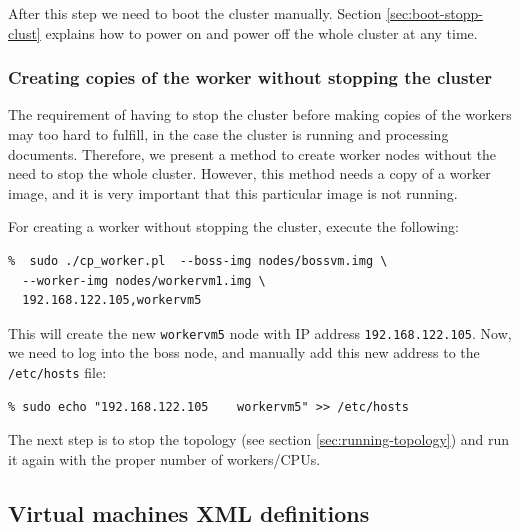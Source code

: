 \documentclass[a4]{article}
\begin{document}
After this step we need to boot the cluster manually. Section
\ref{sec:boot-stopp-clust} explains how to power on and power off the whole
cluster at any time.

\subsubsection*{Creating copies of the worker without stopping the cluster}
\label{sec:creat-copi-work}

The requirement of having to stop the cluster before making copies of the
workers may too hard to fulfill, in the case the cluster is running and
processing documents. Therefore, we present a method to create worker
nodes without the need to stop the whole cluster. However, this method needs
a copy of a worker image, and it is very important that this particular
image is not running.

For creating a worker without stopping the cluster, execute the following:

\begin{verbatim}
%  sudo ./cp_worker.pl  --boss-img nodes/bossvm.img \
  --worker-img nodes/workervm1.img \
  192.168.122.105,workervm5
\end{verbatim}

This will create the new \texttt{workervm5} node with IP address
\texttt{192.168.122.105}. Now, we need to log into the boss node, and
manually add this new address to the \texttt{/etc/hosts} file:

\begin{verbatim}
% sudo echo "192.168.122.105	workervm5" >> /etc/hosts
\end{verbatim}

The next step is to stop the topology (see section
\ref{sec:running-topology}) and run it again with the proper number of
workers/CPUs.

\subsection{Virtual machines XML definitions}
\label{sec:virtual-machines-xml}
\end{document}
